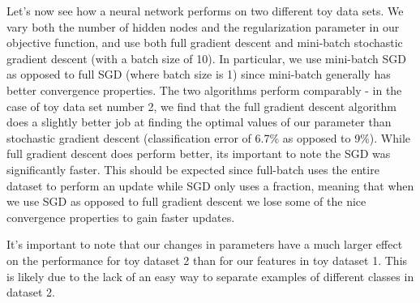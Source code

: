 \documentclass[10pt]{article}
\begin{document}
Let's now see how a neural network performs on two different toy data sets. We vary both the number of hidden nodes and the regularization parameter in our objective function, and use both full gradient descent and mini-batch stochastic gradient descent (with a batch size of 10). In particular, we use mini-batch SGD as opposed to full SGD (where batch size is 1) since mini-batch generally has better convergence properties. The two algorithms perform comparably - in the case of toy data set number 2, we find that the full gradient descent algorithm does a slightly better job at finding the optimal values of our parameter than stochastic gradient descent (classification error of 6.7\% as opposed to 9\%). While full gradient descent does perform better, its important to note the SGD was significantly faster. This should be expected since full-batch uses the entire dataset to perform an update while SGD only uses a fraction, meaning that when we use SGD as opposed to full gradient descent we lose some of the nice convergence properties to gain faster updates. 

It's important to note that our changes in parameters have a much larger effect on the performance for toy dataset 2 than for our features in toy dataset 1. This is likely due to the lack of an easy way to separate examples of different classes in dataset 2.
\end{document}
